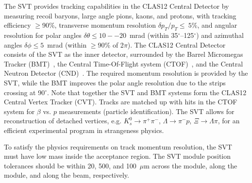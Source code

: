 The SVT provides tracking capabilities in the CLAS12 Central Detector by measuring recoil baryons, large angle
pions, kaons, and protons, with tracking efficiency $\ge$90\%, transverse momentum resolution
$\delta p_T/p_T \le~5$\%, and angular resolution for polar angles $\delta \theta \le 10--20$~mrad (within
35$^\circ$--125$^\circ$) and azimuthal angles $\delta \phi \le 5$~mrad (within $\ge$90\% of 2$\pi$). The
CLAS12 Central Detector consists of the SVT as the inner detector, surrounded by the Barrel Micromegas Tracker
(BMT)~\cite{mm-nim}, the Central Time-Of-Flight system (CTOF)~\cite{ctof-nim}, and the Central Neutron Detector
(CND)~\cite{cnd-nim}. The required momentum resolution is provided by the SVT, while the BMT improves the polar
angle resolution due to the strips crossing at 90$^\circ$. Note that together the SVT and BMT systems form the
CLAS12 Central Vertex Tracker (CVT). Tracks are matched up with hits in the CTOF system for $\beta$ vs. $p$
measurements (particle identification). The SVT allows for reconstruction of detached vertices, e.g.
$K^0_s \to \pi^+\pi^-$, $\Lambda \to \pi^-p$, $\Xi \to \Lambda\pi$, for an efficient experimental program
in strangeness physics.  

To satisfy the physics requirements on track momentum resolution, the SVT must have low mass inside the acceptance
region. The SVT module position tolerances should be within 20, 500, and 100~$\mu$m across the module, along the
module, and along the beam, respectively.
